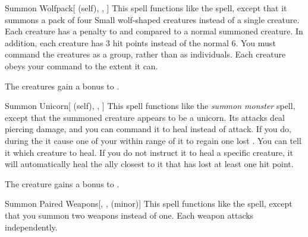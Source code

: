 \lowercase{\hypertarget{spell:Summon Wolfpack}{}}\label{spell:Summon Wolfpack}
\begin{attuneability}[Rank 5]{\hypertarget{spell:Summon Wolfpack}{Summon Wolfpack}}[ (self), , ]
This spell functions like the  spell, except that it summons a pack of four Small wolf-shaped creatures instead of a single creature.
Each creature has a  penalty to  and  compared to a normal summoned creature.
In addition, each creature has 3 hit points instead of the normal 6.
You must command the creatures as a group, rather than as individuals.
Each creature obeys your command to the extent it can.

\rankline
{} The creatures gain a  bonus to .

\end{attuneability}
\vspace{0.25em}



\lowercase{\hypertarget{spell:Summon Unicorn}{}}\label{spell:Summon Unicorn}
\begin{attuneability}[Rank 6]{\hypertarget{spell:Summon Unicorn}{Summon Unicorn}}[ (self), , ]
This spell functions like the \textit{summon monster} spell, except that the summoned creature appears to be a unicorn.
Its attacks deal piercing damage, and you can command it to heal instead of attack.
If you do, during the  it cause one of your  within \rngclose range of it to regain one lost .
You can tell it which creature to heal.
If you do not instruct it to heal a specific creature, it will automatically heal the ally closest to it that has lost at least one hit point.

\rankline
{} The creature gains a  bonus to .

\end{attuneability}
\vspace{0.25em}



\lowercase{\hypertarget{spell:Summon Paired Weapons}{}}\label{spell:Summon Paired Weapons}
\begin{freeability}[Rank 8]{\hypertarget{spell:Summon Paired Weapons}{Summon Paired Weapons}}[, ,  (minor)]
This spell functions like the  spell, except that you summon two weapons instead of one.
Each weapon attacks independently.

\end{freeability}
\vspace{0.25em}



